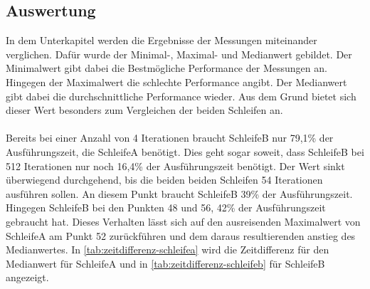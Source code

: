     \subsection{Auswertung}
    In dem Unterkapitel werden die Ergebnisse der Messungen miteinander verglichen.
    Dafür wurde der Minimal-, Maximal- und Medianwert gebildet.
    Der Minimalwert gibt dabei die Bestmögliche Performance der Messungen an.
    Hingegen der Maximalwert die schlechte Performance angibt.
    Der Medianwert gibt dabei die durchschnittliche Performance wieder.
    Aus dem Grund bietet sich dieser Wert besonders zum Vergleichen der beiden Schleifen an.\\
    \\
    Bereits bei einer Anzahl von 4 Iterationen braucht SchleifeB nur 79,1\% der Ausführungszeit, die SchleifeA benötigt.
    Dies geht sogar soweit, dass SchleifeB bei 512 Iterationen nur noch 16,4\% der Ausführungszeit benötigt.
    Der Wert sinkt überwiegend durchgehend, bis die beiden beiden Schleifen 54 Iterationen ausführen sollen.
    An diesem Punkt braucht SchleifeB 39\% der Ausführungszeit.
    Hingegen SchleifeB bei den Punkten 48 und 56, 42\% der Ausführungszeit gebraucht hat.
    Dieses Verhalten lässt sich auf den ausreisenden Maximalwert von SchleifeA am Punkt 52 zurückführen und dem daraus resultierenden anstieg des Medianwertes.
    In \cref{tab:zeitdifferenz-schleifea} wird die Zeitdifferenz für den Medianwert für SchleifeA und in \cref{tab:zeitdifferenz-schleifeb} für SchleifeB angezeigt.
    
